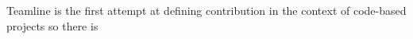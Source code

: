 \documentclass[../manifest.tex]{subfiles}
\begin{document}
Teamline is the first attempt at defining contribution in the context of code-based projects so there is



%





\end{document}
